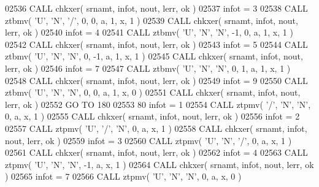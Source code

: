 \begin{DoxyCode}
02536       \textcolor{keyword}{CALL }chkxer( srnamt, infot, nout, lerr, ok )
02537       infot = 3
02538       \textcolor{keyword}{CALL }ztbmv( \textcolor{stringliteral}{'U'}, \textcolor{stringliteral}{'N'}, \textcolor{stringliteral}{'/'}, 0, 0, a, 1, x, 1 )
02539       \textcolor{keyword}{CALL }chkxer( srnamt, infot, nout, lerr, ok )
02540       infot = 4
02541       \textcolor{keyword}{CALL }ztbmv( \textcolor{stringliteral}{'U'}, \textcolor{stringliteral}{'N'}, \textcolor{stringliteral}{'N'}, -1, 0, a, 1, x, 1 )
02542       \textcolor{keyword}{CALL }chkxer( srnamt, infot, nout, lerr, ok )
02543       infot = 5
02544       \textcolor{keyword}{CALL }ztbmv( \textcolor{stringliteral}{'U'}, \textcolor{stringliteral}{'N'}, \textcolor{stringliteral}{'N'}, 0, -1, a, 1, x, 1 )
02545       \textcolor{keyword}{CALL }chkxer( srnamt, infot, nout, lerr, ok )
02546       infot = 7
02547       \textcolor{keyword}{CALL }ztbmv( \textcolor{stringliteral}{'U'}, \textcolor{stringliteral}{'N'}, \textcolor{stringliteral}{'N'}, 0, 1, a, 1, x, 1 )
02548       \textcolor{keyword}{CALL }chkxer( srnamt, infot, nout, lerr, ok )
02549       infot = 9
02550       \textcolor{keyword}{CALL }ztbmv( \textcolor{stringliteral}{'U'}, \textcolor{stringliteral}{'N'}, \textcolor{stringliteral}{'N'}, 0, 0, a, 1, x, 0 )
02551       \textcolor{keyword}{CALL }chkxer( srnamt, infot, nout, lerr, ok )
02552       \textcolor{keywordflow}{GO TO} 180
02553    80 infot = 1
02554       \textcolor{keyword}{CALL }ztpmv( \textcolor{stringliteral}{'/'}, \textcolor{stringliteral}{'N'}, \textcolor{stringliteral}{'N'}, 0, a, x, 1 )
02555       \textcolor{keyword}{CALL }chkxer( srnamt, infot, nout, lerr, ok )
02556       infot = 2
02557       \textcolor{keyword}{CALL }ztpmv( \textcolor{stringliteral}{'U'}, \textcolor{stringliteral}{'/'}, \textcolor{stringliteral}{'N'}, 0, a, x, 1 )
02558       \textcolor{keyword}{CALL }chkxer( srnamt, infot, nout, lerr, ok )
02559       infot = 3
02560       \textcolor{keyword}{CALL }ztpmv( \textcolor{stringliteral}{'U'}, \textcolor{stringliteral}{'N'}, \textcolor{stringliteral}{'/'}, 0, a, x, 1 )
02561       \textcolor{keyword}{CALL }chkxer( srnamt, infot, nout, lerr, ok )
02562       infot = 4
02563       \textcolor{keyword}{CALL }ztpmv( \textcolor{stringliteral}{'U'}, \textcolor{stringliteral}{'N'}, \textcolor{stringliteral}{'N'}, -1, a, x, 1 )
02564       \textcolor{keyword}{CALL }chkxer( srnamt, infot, nout, lerr, ok )
02565       infot = 7
02566       \textcolor{keyword}{CALL }ztpmv( \textcolor{stringliteral}{'U'}, \textcolor{stringliteral}{'N'}, \textcolor{stringliteral}{'N'}, 0, a, x, 0 )

\end{DoxyCode}
